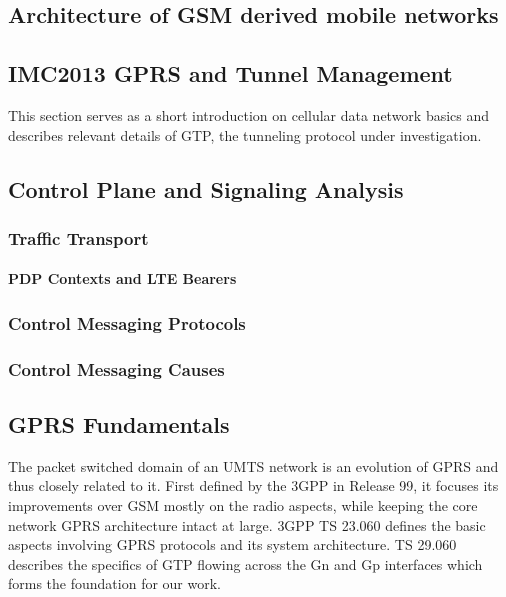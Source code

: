 %
%
\subsection{Architecture of GSM derived mobile networks}
\label{sec:3gpparchitecture}

\subsection{IMC2013 GPRS and Tunnel Management}
\label{sec:gtp-IMC}


This section serves as a short introduction on cellular data network basics and describes relevant details of \ac{GTP}, the tunneling protocol under investigation.




\subsection{Control Plane and Signaling Analysis}
\subsubsection{Traffic Transport}
\paragraph{PDP Contexts and LTE Bearers}
\subsubsection{Control Messaging Protocols}
\subsubsection{Control Messaging Causes}



\subsection{\acs{GPRS} Fundamentals}

The packet switched domain of an \ac{UMTS} network is an evolution of \ac{GPRS} and thus closely related to it. First defined by the \ac{3GPP} in Release 99, it focuses its improvements over \ac{GSM} mostly on the radio aspects, while keeping the core network \ac{GPRS} architecture intact at large. \ac{3GPP} \ac{TS} 23.060 \cite{3gpp23.060} defines the basic aspects involving \ac{GPRS} protocols and its system architecture. \ac{TS} 29.060 \cite{3gpp29.060} describes the specifics of \ac{GTP} flowing across the Gn and Gp interfaces which forms the foundation for our work.

